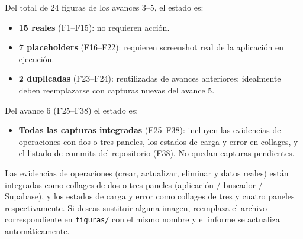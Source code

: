 Del total de 24 figuras de los avances 3--5, el estado es:

\begin{itemize}
  \item \textbf{15 reales} (F1--F15): no requieren acci\'on.
  \item \textbf{7 placeholders} (F16--F22): requieren screenshot real
    de la aplicaci\'on en ejecuci\'on.
  \item \textbf{2 duplicadas} (F23--F24): reutilizadas de avances
    anteriores; idealmente deben reemplazarse con capturas nuevas del
    avance 5.
\end{itemize}

Del avance 6 (F25--F38) el estado es:

\begin{itemize}
  \item \textbf{Todas las capturas integradas} (F25--F38): incluyen las
    evidencias de operaciones con dos o tres paneles, los estados de
    carga y error en collages, y el listado de commits del repositorio
    (F38). No quedan capturas pendientes.
\end{itemize}

Las evidencias de operaciones (crear, actualizar, eliminar y datos
reales) est\'an integradas como collages de dos o tres paneles
(aplicaci\'on / buscador / Supabase), y los estados de carga y error
como collages de tres y cuatro paneles respectivamente. Si deseas
sustituir alguna imagen, reemplaza el archivo correspondiente en
\texttt{figuras/} con el mismo nombre y el informe se actualiza
autom\'aticamente.
